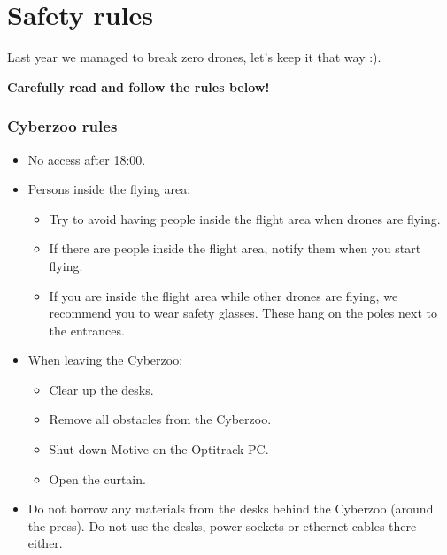\documentclass{article}
\begin{document}


\section{Safety rules}

Last year we managed to break zero drones, let's keep it that way :).

\textbf{Carefully read and follow the rules below!}
\subsubsection*{Cyberzoo rules}
\begin{itemize}
\item No access after 18:00.
\item Persons inside the flying area:
\begin{itemize}
\item Try to avoid having people inside the flight area when drones are flying.
\item If there are people inside the flight area, notify them when you start flying.
\item If you are inside the flight area while other drones are flying, we recommend you to wear safety glasses. These hang on the poles next to the entrances.
\end{itemize}
\item When leaving the Cyberzoo:
\begin{itemize}
\item Clear up the desks.
\item Remove all obstacles from the Cyberzoo.
\item Shut down Motive on the Optitrack PC.
\item Open the curtain.
\end{itemize}
\item Do not borrow any materials from the desks behind the Cyberzoo (around the press). Do not use the desks, power sockets or ethernet cables there either.
\end{itemize}
\end{document}
